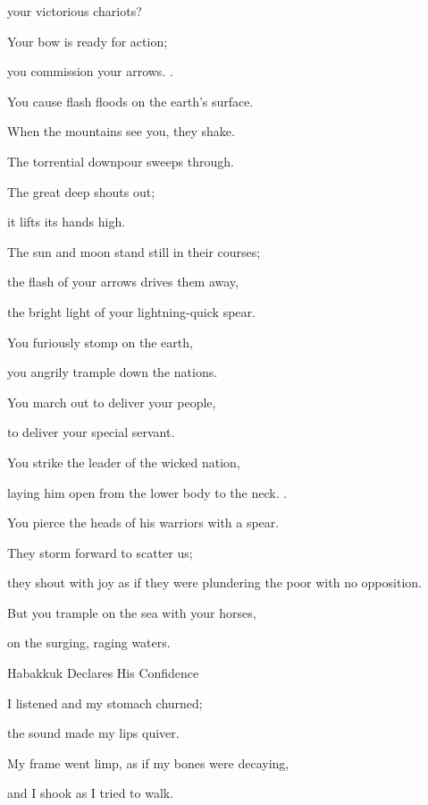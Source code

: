 {\par }{\Q your victorious
chariots?
\par }{\Q {}Your bow
is ready
for action;
\par }{\Q you commission
your arrows.
{}.
\par }{\Q You cause flash floods
on the earth’s surface.
\par }{\Q {}When the mountains
see
you, they shake.
\par }{\Q The torrential downpour
sweeps through.
\par }{\Q The great deep
shouts
out;
\par }{\Q it lifts
its hands
high.
\par }{\Q {}The sun
and moon
stand
still in their courses;
\par }{\Q the flash
of your arrows
drives
them away,
\par }{\Q the bright light
of your lightning-quick
spear.
\par }{\Q {}You furiously
stomp
on the earth,
\par }{\Q you angrily
trample
down the nations.
\par }{\Q {}You march out
to deliver your
people,
\par }{\Q to deliver your
special servant.
\par }{\Q You strike
the leader
of the wicked
nation,
\par }{\Q laying
him open from the lower
body to
the neck.
{}.
\par }{\Q {}You pierce
the heads
of his warriors with a spear.
\par }{\Q They storm
forward to scatter
us;

\par }{\Q they shout with joy
as
if they were plundering
the poor
with no opposition.
\par }{\Q {}But you trample
on the sea
with your horses,
\par }{\Q on the surging,
raging
waters.
\par }{\SH Habakkuk Declares His Confidence
\par }{\Q {}I listened
and my stomach
churned;
\par }{\Q the sound
made my lips
quiver.
\par }{\Q My frame went
limp, as if my bones
were decaying,
\par }{\Q and I shook
as
I tried to walk.

}
